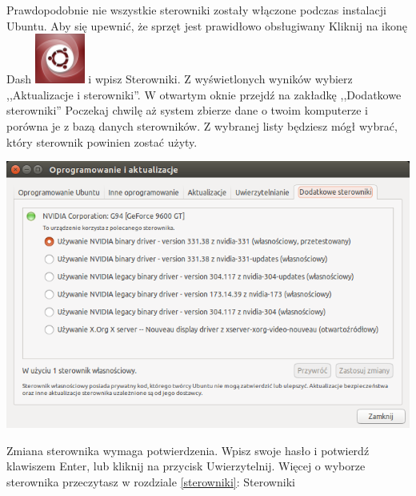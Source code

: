 Prawdopodobnie nie wszystkie sterowniki zostały włączone podczas instalacji Ubuntu. Aby się upewnić, że sprzęt jest prawidłowo obsługiwany Kliknij na ikonę Dash \includegraphics[scale=0.35]{images/ikony_dash.png} i wpisz \textcolor{ubuntu_orange}{Sterowniki}. Z wyświetlonych wyników wybierz ,,Aktualizacje i sterowniki''. W otwartym oknie przejdź na zakładkę ,,Dodatkowe sterowniki'' Poczekaj chwilę aż system zbierze dane o twoim komputerze i porówna je z bazą danych sterowników. Z wybranej listy będziesz mógł wybrać, który sterownik powinien zostać użyty.
\begin{center}
        \includegraphics[width=\linewidth]{images/pierwsze_uruchomienie_driver2.png}
\end{center}

Zmiana sterownika wymaga potwierdzenia. Wpisz swoje hasło i potwierdź klawiszem Enter, lub kliknij na przycisk \textcolor{ubuntu_orange}{Uwierzytelnij}. Więcej o wyborze sterownika przeczytasz w rozdziale \ref{sterowniki}: Sterowniki

